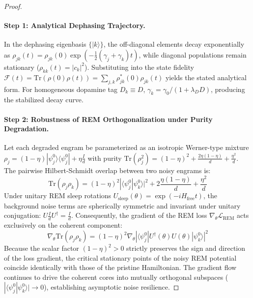 \documentclass[10pt,twocolumn,3p]{article}
\begin{document}
\begin{proof}
\paragraph{Step 1: Analytical Dephasing Trajectory.}
In the dephasing eigenbasis $\{|k\rangle\}$, the off-diagonal elements decay exponentially as $\rho_{jk}(t) = \rho_{jk}(0) \exp\left( - \frac{1}{2} (\gamma_j + \gamma_k) t \right)$, while diagonal populations remain stationary ($\rho_{kk}(t) = |c_k|^2$). Substituting into the state fidelity $\mathcal{F}(t) = \text{Tr}(\rho(0) \rho(t)) = \sum_{j,k} \rho_{jk}^*(0) \rho_{jk}(t)$ yields the stated analytical form. For homogeneous dopamine tag $D_k \equiv D$, $\gamma_k = \gamma_0 / (1 + \lambda_D D)$, producing the stabilized decay curve.

\paragraph{Step 2: Robustness of REM Orthogonalization under Purity Degradation.}
Let each degraded engram be parameterized as an isotropic Werner-type mixture $\rho_j = (1 - \eta) |\psi_j^0\rangle\langle\psi_j^0| + \eta \frac{I}{d}$ with purity $\text{Tr}(\rho_j^2) = (1 - \eta)^2 + \frac{2\eta(1-\eta)}{d} + \frac{\eta^2}{d}$. The pairwise Hilbert-Schmidt overlap between two noisy engrams is:
\begin{equation}
    \text{Tr}(\rho_j \rho_k) = (1 - \eta)^2 |\langle\psi_j^0|\psi_k^0\rangle|^2 + 2\frac{\eta(1-\eta)}{d} + \frac{\eta^2}{d}
\end{equation}
Under unitary REM sleep rotations $U_{\text{sleep}}(\theta) = \exp(-i H_{\text{free}} t)$, the background noise terms are spherically symmetric and invariant under unitary conjugation: $U \frac{I}{d} U^\dagger = \frac{I}{d}$. Consequently, the gradient of the REM loss $\nabla_\theta \mathcal{L}_{\text{REM}}$ acts exclusively on the coherent component:
\begin{equation}
    \nabla_\theta \text{Tr}(\rho_j \rho_k) = (1 - \eta)^2 \nabla_\theta |\langle\psi_j^0| U^\dagger(\theta) U(\theta) |\psi_k^0\rangle|^2
\end{equation}
Because the scalar factor $(1-\eta)^2 > 0$ strictly preserves the sign and direction of the loss gradient, the critical stationary points of the noisy REM potential coincide identically with those of the pristine Hamiltonian. The gradient flow continues to drive the coherent cores into mutually orthogonal subspaces ($|\langle\psi_j^0|\psi_k^0\rangle| \to 0$), establishing asymptotic noise resilience.
\end{proof}
\end{document}
